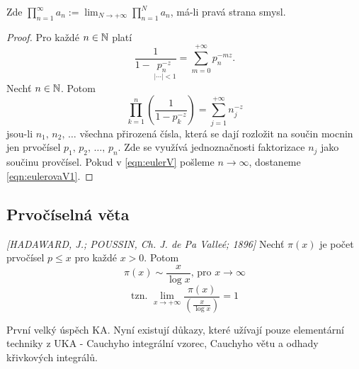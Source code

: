 \begin{note*}
Zde $\prod_{n=1}^\infty a_n:=\lim_{N\rightarrow+\infty}\prod_{n=1}^N a_n$, má-li pravá strana smysl.
\end{note*}

\begin{proof}
Pro každé $n\in\operatorname{\mathbb{N}}$ platí 
$$\frac{1}{1-\underset{\phantom{.}|\cdots|<1}{p_n^{-z}}}=\sum_{m=0}^{+\infty}p_n^{-mz}.$$
Nechť $n\in\operatorname{\mathbb{N}}$. Potom
\begin{equation}\tag{*}\label{eqn:eulerV}
    \prod_{k=1}^n\left(\frac{1}{1-p_k^{-z}}\right)=\sum_{j=1}^{+\infty}n_j^{-z}
\end{equation}
jsou-li $n_1,\,n_2,\,\ldots$ všechna přirozená čísla, která se dají rozložit na součin mocnin jen prvočísel $p_1,\,p_2,\,\ldots,\,p_n$. 
Zde se využívá jednoznačnosti faktorizace $n_j$ jako součinu provčísel. Pokud v \cref{eqn:eulerV} pošleme $n\rightarrow\infty$, dostaneme \cref{eqn:eulerovaV1}.
\end{proof}

\subsection{Prvočíselná věta}

\begin{theorem}[Prvočíselná] \emph{[HADAWARD, J.; POUSSIN, Ch. J. de Pa Valleé; 1896]}
Nechť $\pi(x)$ je počet prvočísel $p\leq x$ pro každé $x>0$. Potom 
$$\pi(x)\sim \frac{x}{\log x}\text{, pro }x\rightarrow\infty $$
$$\text{tzn. }\lim_{x\rightarrow+\infty}\frac{\pi(x)}{\left(\frac{x}{\log x}\right)}=1
$$
\end{theorem}

\begin{note*}
První velký úspěch KA. Nyní existují důkazy, které užívají pouze elementární techniky z UKA - Cauchyho integrální vzorec, Cauchyho větu a odhady křivkových integrálů.
\end{note*}